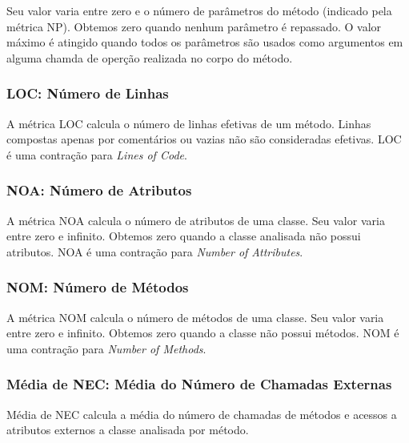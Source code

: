	Seu valor varia entre zero e o número de parâmetros do método (indicado pela métrica NP). Obtemos zero quando nenhum parâmetro é repassado. O valor máximo é atingido quando todos os parâmetros são usados como argumentos em alguma chamda de operção realizada no corpo do método. 
                                                      
                                                             

\subsubsection{LOC: Número de Linhas}

	A métrica LOC \citep{LK94} calcula o número de linhas efetivas de um método. Linhas compostas apenas por comentários ou vazias não são consideradas efetivas. LOC é uma contração para \textit{Lines of Code}.



\subsubsection{NOA: Número de Atributos}

	A métrica NOA calcula o número de atributos de uma classe. Seu valor varia entre zero e infinito. Obtemos zero quando a classe analisada não possui atributos. NOA é uma contração para \textit{Number of Attributes}.
                          


\subsubsection{NOM: Número de Métodos}

	A métrica NOM calcula o número de métodos de uma classe. Seu valor varia entre zero e infinito. Obtemos zero quando a classe não possui métodos. NOM é uma contração para \textit{Number of Methods}.
                                                            
         

\subsubsection{Média de NEC: Média do Número de Chamadas Externas}
         
	Média de NEC calcula a média do número de chamadas de métodos e acessos a atributos externos a classe analisada por método.



